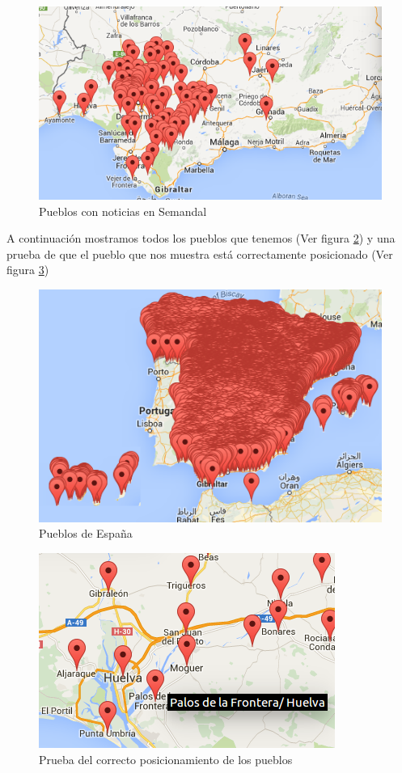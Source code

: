 \begin{figure}
\centering
\includegraphics[scale=0.5]{./obdat/imagenes/p_noticias.png}
\caption{Pueblos con noticias en Semandal}
\label{fig:pueblos_noticias}
\end{figure}


A continuación mostramos todos los pueblos que tenemos (Ver figura \ref{fig:imagen_todos}) y una prueba de que el pueblo que nos muestra está correctamente posicionado (Ver figura \ref{fig:imagen_uno})

\begin{figure}
\centering
\includegraphics[scale=0.5]{./obdat/imagenes/Todos.png}
\caption{Pueblos de España}
\label{fig:imagen_todos}
\end{figure}

\begin{figure}
\centering
\includegraphics[scale=0.5]{./obdat/imagenes/NombresPueblos.png}
\caption{Prueba del correcto posicionamiento de los pueblos}
\label{fig:imagen_uno}
\end{figure}
